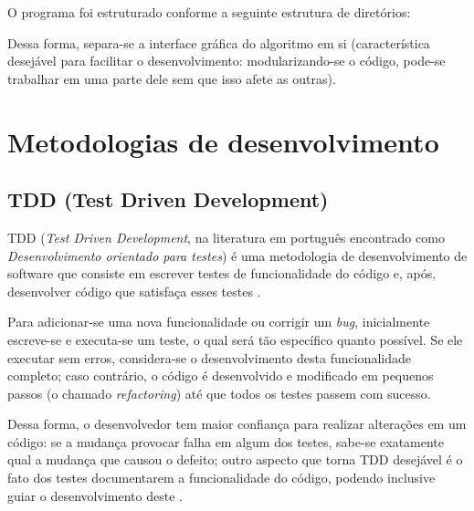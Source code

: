 O programa foi estruturado conforme a seguinte estrutura de diretórios:


Dessa forma, separa-se a interface gráfica do algoritmo em si (característica desejável para facilitar o desenvolvimento: modularizando-se o código, pode-se trabalhar em uma parte dele sem que isso afete as outras).

\section{Metodologias de desenvolvimento}
\subsection{TDD (Test Driven Development)}

TDD (\textit{Test Driven Development}, na literatura em português encontrado como \textit{Desenvolvimento orientado para testes}) é uma metodologia de desenvolvimento de software que consiste em escrever testes de funcionalidade do código e, após, desenvolver código que satisfaça esses testes \cite{tdd}. 

Para adicionar-se uma nova funcionalidade ou corrigir um \textit{bug}, inicialmente escreve-se e executa-se um teste, o qual será tão específico quanto possível. Se ele executar sem erros, considera-se o desenvolvimento desta funcionalidade completo; caso contrário, o código é desenvolvido e modificado em pequenos passos (o chamado \textit{refactoring}) até que todos os testes passem com sucesso.

Dessa forma, o desenvolvedor tem maior confiança para realizar alterações em um código: se a mudança provocar falha em algum dos testes, sabe-se exatamente qual a mudança que causou o defeito; outro aspecto que torna TDD desejável é o fato dos testes documentarem a funcionalidade do código, podendo inclusive guiar o desenvolvimento deste \cite{aniche}.

